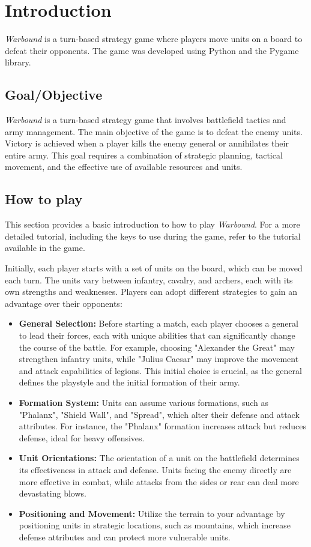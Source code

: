 \section{Introduction}
\textit{Warbound} is a turn-based strategy game where players move units on a board to defeat their opponents. The game was developed using Python and the Pygame library.

\subsection{Goal/Objective}
\textit{Warbound} is a turn-based strategy game that involves battlefield tactics and army management. The main objective of the game is to defeat the enemy units. Victory is achieved when a player kills the enemy general or annihilates their entire army. This goal requires a combination of strategic planning, tactical movement, and the effective use of available resources and units.

\subsection{How to play}
This section provides a basic introduction to how to play \textit{Warbound}. For a more detailed tutorial, including the keys to use during the game, refer to the tutorial available in the game.

Initially, each player starts with a set of units on the board, which can be moved each turn. The units vary between infantry, cavalry, and archers, each with its own strengths and weaknesses. Players can adopt different strategies to gain an advantage over their opponents:

\begin{itemize}
    \item \textbf{General Selection:} Before starting a match, each player chooses a general to lead their forces, each with unique abilities that can significantly change the course of the battle. For example, choosing "Alexander the Great" may strengthen infantry units, while "Julius Caesar" may improve the movement and attack capabilities of legions. This initial choice is crucial, as the general defines the playstyle and the initial formation of their army.
    \item \textbf{Formation System:} Units can assume various formations, such as "Phalanx", "Shield Wall", and "Spread", which alter their defense and attack attributes. For instance, the "Phalanx" formation increases attack but reduces defense, ideal for heavy offensives.
    \item \textbf{Unit Orientations:} The orientation of a unit on the battlefield determines its effectiveness in attack and defense. Units facing the enemy directly are more effective in combat, while attacks from the sides or rear can deal more devastating blows.
    \item \textbf{Positioning and Movement:} Utilize the terrain to your advantage by positioning units in strategic locations, such as mountains, which increase defense attributes and can protect more vulnerable units.
\end{itemize}
